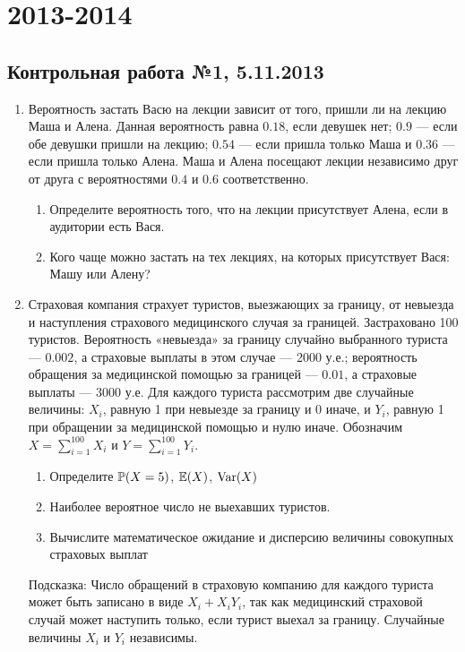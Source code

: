\section{2013-2014}

\subsection{Контрольная работа №1, 5.11.2013}

\begin{enumerate}
\item Вероятность застать Васю на лекции зависит от того, пришли ли на лекцию Маша и Алена. Данная вероятность равна $0.18$, если девушек нет; $0.9$ — если обе девушки пришли на лекцию; $0.54$ — если пришла только Маша и $0.36$ — если пришла только Алена. Маша и Алена посещают лекции независимо друг от друга с вероятностями $0.4$ и $0.6$ соответственно.
\begin{enumerate}
\item Определите вероятность того, что на лекции присутствует Алена, если в аудитории есть Вася.
\item Кого чаще можно застать на тех лекциях, на которых присутствует Вася: Машу или Алену?
\end{enumerate}


\item Страховая компания страхует туристов, выезжающих за границу, от невыезда и наступления страхового медицинского случая за границей. Застраховано 100 туристов. Вероятность «невыезда» за границу случайно выбранного туриста — $0.002$, а страховые выплаты в этом случае — 2000 у.е.; вероятность обращения за медицинской помощью за границей — $0.01$, а страховые выплаты — 3000 у.е. Для каждого туриста рассмотрим две случайные величины: $X_i$, равную 1 при невыезде за границу и 0 иначе, и $Y_i$, равную 1 при обращении за медицинской помощью и нулю иначе. Обозначим $X=\sum_{i=1}^{100}X_i$ и $Y=\sum_{i=1}^{100}Y_i$.
\begin{enumerate}
\item Определите $\P(X=5)$, $\E(X)$, $\Var(X)$
\item Наиболее вероятное число не выехавших туристов.
\item Вычислите математическое ожидание и дисперсию величины совокупных страховых выплат
\end{enumerate}
Подсказка: Число обращений в страховую компанию для каждого туриста может быть записано в виде $X_i+X_i Y_i$, так как медицинский страховой случай может наступить только, если турист выехал за границу. Случайные величины $X_i$ и $Y_i$ независимы.


\end{enumerate}
